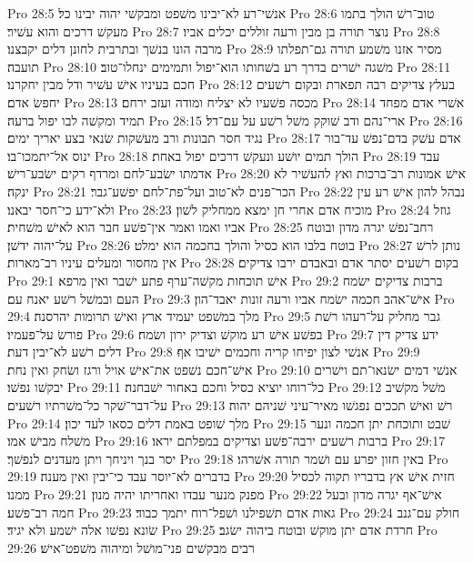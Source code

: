 Pro 28:5  אנשׁי־רע לא־יבינו משׁפט ומבקשׁי יהוה יבינו כל׃
Pro 28:6  טוב־רשׁ הולך בתמו מעקשׁ דרכים והוא עשׁיר׃
Pro 28:7  נוצר תורה בן מבין ורעה זוללים יכלים אביו׃
Pro 28:8  מרבה הונו בנשׁך ובתרבית לחונן דלים יקבצנו׃
Pro 28:9  מסיר אזנו משׁמע תורה גם־תפלתו תועבה׃
Pro 28:10  משׁגה ישׁרים בדרך רע בשׁחותו הוא־יפול ותמימים ינחלו־טוב׃
Pro 28:11  חכם בעיניו אישׁ עשׁיר ודל מבין יחקרנו׃
Pro 28:12  בעלץ צדיקים רבה תפארת ובקום רשׁעים יחפשׂ אדם׃
Pro 28:13  מכסה פשׁעיו לא יצליח ומודה ועזב ירחם׃
Pro 28:14  אשׁרי אדם מפחד תמיד ומקשׁה לבו יפול ברעה׃
Pro 28:15  ארי־נהם ודב שׁוקק משׁל רשׁע על עם־דל׃
Pro 28:16  נגיד חסר תבונות ורב מעשׁקות שׂנאי בצע יאריך ימים׃
Pro 28:17  אדם עשׁק בדם־נפשׁ עד־בור ינוס אל־יתמכו־בו׃
Pro 28:18  הולך תמים יושׁע ונעקשׁ דרכים יפול באחת׃
Pro 28:19  עבד אדמתו ישׂבע־לחם ומרדף רקים ישׂבע־רישׁ׃
Pro 28:20  אישׁ אמונות רב־ברכות ואץ להעשׁיר לא ינקה׃
Pro 28:21  הכר־פנים לא־טוב ועל־פת־לחם יפשׁע־גבר׃
Pro 28:22  נבהל להון אישׁ רע עין ולא־ידע כי־חסר יבאנו׃
Pro 28:23  מוכיח אדם אחרי חן ימצא ממחליק לשׁון׃
Pro 28:24  גוזל אביו ואמו ואמר אין־פשׁע חבר הוא לאישׁ משׁחית׃
Pro 28:25  רחב־נפשׁ יגרה מדון ובוטח על־יהוה ידשׁן׃
Pro 28:26  בוטח בלבו הוא כסיל והולך בחכמה הוא ימלט׃
Pro 28:27  נותן לרשׁ אין מחסור ומעלים עיניו רב־מארות׃
Pro 28:28  בקום רשׁעים יסתר אדם ובאבדם ירבו צדיקים׃
Pro 29:1  אישׁ תוכחות מקשׁה־ערף פתע ישׁבר ואין מרפא׃
Pro 29:2  ברבות צדיקים ישׂמח העם ובמשׁל רשׁע יאנח עם׃
Pro 29:3  אישׁ־אהב חכמה ישׂמח אביו ורעה זונות יאבד־הון׃
Pro 29:4  מלך במשׁפט יעמיד ארץ ואישׁ תרומות יהרסנה׃
Pro 29:5  גבר מחליק על־רעהו רשׁת פורשׂ על־פעמיו׃
Pro 29:6  בפשׁע אישׁ רע מוקשׁ וצדיק ירון ושׂמח׃
Pro 29:7  ידע צדיק דין דלים רשׁע לא־יבין דעת׃
Pro 29:8  אנשׁי לצון יפיחו קריה וחכמים ישׁיבו אף׃
Pro 29:9  אישׁ־חכם נשׁפט את־אישׁ אויל ורגז ושׂחק ואין נחת׃
Pro 29:10  אנשׁי דמים ישׂנאו־תם וישׁרים יבקשׁו נפשׁו׃
Pro 29:11  כל־רוחו יוציא כסיל וחכם באחור ישׁבחנה׃
Pro 29:12  משׁל מקשׁיב על־דבר־שׁקר כל־משׁרתיו רשׁעים׃
Pro 29:13  רשׁ ואישׁ תככים נפגשׁו מאיר־עיני שׁניהם יהוה׃
Pro 29:14  מלך שׁופט באמת דלים כסאו לעד יכון׃
Pro 29:15  שׁבט ותוכחת יתן חכמה ונער משׁלח מבישׁ אמו׃
Pro 29:16  ברבות רשׁעים ירבה־פשׁע וצדיקים במפלתם יראו׃
Pro 29:17  יסר בנך ויניחך ויתן מעדנים לנפשׁך׃
Pro 29:18  באין חזון יפרע עם ושׁמר תורה אשׁרהו׃
Pro 29:19  בדברים לא־יוסר עבד כי־יבין ואין מענה׃
Pro 29:20  חזית אישׁ אץ בדבריו תקוה לכסיל ממנו׃
Pro 29:21  מפנק מנער עבדו ואחריתו יהיה מנון׃
Pro 29:22  אישׁ־אף יגרה מדון ובעל חמה רב־פשׁע׃
Pro 29:23  גאות אדם תשׁפילנו ושׁפל־רוח יתמך כבוד׃
Pro 29:24  חולק עם־גנב שׂונא נפשׁו אלה ישׁמע ולא יגיד׃
Pro 29:25  חרדת אדם יתן מוקשׁ ובוטח ביהוה ישׂגב׃
Pro 29:26  רבים מבקשׁים פני־מושׁל ומיהוה משׁפט־אישׁ׃
